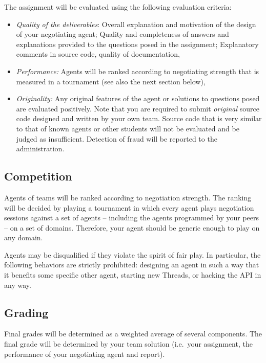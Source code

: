 \documentclass[a4paper]{article}
\newcommand{\expdate}{17 November}
\begin{document}
The assignment will be evaluated using the following evaluation criteria:
\begin{itemize}
\item {\em Quality of the deliverables}: Overall explanation and motivation of the design of your negotiating agent; Quality and completeness of answers and explanations provided to the questions posed in the assignment; Explanatory comments in source code, quality of documentation,
\item {\em Performance:} Agents will be ranked according to negotiating strength that is measured in a tournament (see also the next section below),
\item {\em Originality:} Any original features of the agent or solutions to questions posed are evaluated positively. Note that you are required to submit \emph{original} source code designed and written by your own team. Source code that is very similar to that of known agents or other students will not be evaluated and be judged as insufficient. Detection of fraud will be reported to the administration.
\end{itemize}
 

\subsection{Competition}

Agents of teams will be ranked according to negotiation strength. The ranking will be decided by playing a tournament in which every agent plays negotiation sessions against a set of agents -- including the agents programmed by your peers -- on a set of domains. Therefore, your agent should be generic enough to play on any domain. 

Agents may be disqualified if they violate the spirit of fair play. In particular, the following behaviors are strictly prohibited: designing an agent in such a way that it benefits some specific other agent, starting new Threads, or hacking the API in any way. 
\subsection{Grading} \label{sec:grading}

Final grades will be determined as a weighted average of several components. The final grade will be determined by your team solution (i.e.\ your assignment, the performance of your negotiating agent and report). 
\end{document}

